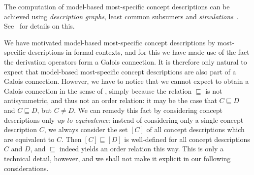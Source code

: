 The computation of model-based most-specific concept descriptions can be achieved using
\emph{\EL description graphs}, least common subsumers and
\emph{simulations}~\cite{DBLP:conf/ijcai/Baader03a,Diss-Felix}.  See~\cite[Section
4.1.2]{Diss-Felix} for details on this.

We have motivated model-based most-specific concept descriptions by most-specific
descriptions in formal contexts, and for this we have made use of the fact the derivation
operators form a Galois connection.  It is therefore only natural to expect that
model-based most-specific concept descriptions are also part of a Galois connection.
However, we have to notice that we cannot expect to obtain a Galois connection in the
sense of , simply because the relation $\sqsubseteq$ is not
antisymmetric, and thus not an order relation: it may be the case that $C \sqsubseteq D$
and $C \sqsubseteq D$, but $C \neq D$.  We can remedy this fact by considering concept
descriptions only \emph{up to equivalence}: instead of considering only a single concept
description $C$, we always consider the set $[C]$ of all concept descriptions which are
equivalent to $C$.  Then $[C] \sqsubseteq [D]$ is well-defined for all concept
descriptions $C$ and $D$, and $\sqsubseteq$ indeed yields an order relation this way.
This is only a technical detail, however, and we shall not make it explicit in our
following considerations.

